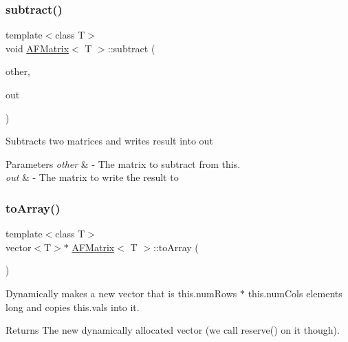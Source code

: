\subsubsection{\texorpdfstring{subtract()}{subtract()}}
{\footnotesize\ttfamily template$<$class T$>$ \\
void \hyperlink{classAFMatrix}{A\+F\+Matrix}$<$ T $>$\+::subtract (\begin{DoxyParamCaption}\item[{\hyperlink{classAFMatrix}{A\+F\+Matrix}$<$ T $>$ $\ast$}]{other,  }\item[{\hyperlink{classAFMatrix}{A\+F\+Matrix}$<$ T $>$ $\ast$}]{out }\end{DoxyParamCaption})\hspace{0.3cm}{\ttfamily [inline]}}

Subtracts two matrices and writes result into {\ttfamily out} 
\begin{DoxyParams}{Parameters}
{\em other} & -\/ The matrix to subtract from {\ttfamily this}. \\
\hline
{\em out} & -\/ The matrix to write the result to \\
\hline
\end{DoxyParams}
\mbox{\label{classAFMatrix_af52ad0a9f20833c04caf93053865bcb4}} 
\subsubsection{\texorpdfstring{to\+Array()}{toArray()}}
{\footnotesize\ttfamily template$<$class T$>$ \\
vector$<$T$>$$\ast$ \hyperlink{classAFMatrix}{A\+F\+Matrix}$<$ T $>$\+::to\+Array (\begin{DoxyParamCaption}{ }\end{DoxyParamCaption})\hspace{0.3cm}{\ttfamily [inline]}}

Dynamically makes a new vector that is {\ttfamily this.\+num\+Rows $\ast$ this.\+num\+Cols} elements long and copies {\ttfamily this.\+vals} into it. \begin{DoxyReturn}{Returns}
The new dynamically allocated vector (we call {\ttfamily reserve()} on it though). 
\end{DoxyReturn}
\mbox{\label{classAFMatrix_ae407612eda3533d1b96ed0fc41ff9d85}} 
